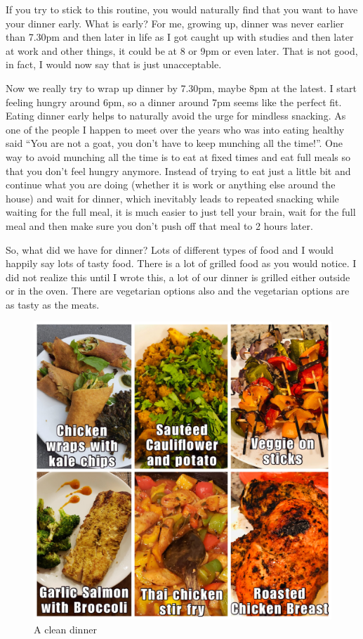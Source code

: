 \documentclass[
  oneside]{book}
\begin{document}
If you try to stick to this routine, you would naturally find that you want to have your dinner early. What is early? For me, growing up, dinner was never earlier than 7.30pm and then later in life as I got caught up with studies and then later at work and other things, it could be at 8 or 9pm or even later. That is not good, in fact, I would now say that is just unacceptable.

Now we really try to wrap up dinner by 7.30pm, maybe 8pm at the latest. I start feeling hungry around 6pm, so a dinner around 7pm seems like the perfect fit. Eating dinner early helps to naturally avoid the urge for mindless snacking. As one of the people I happen to meet over the years who was into eating healthy said ``You are not a goat, you don't have to keep munching all the time!''. One way to avoid munching all the time is to eat at fixed times and eat full meals so that you don't feel hungry anymore. Instead of trying to eat just a little bit and continue what you are doing (whether it is work or anything else around the house) and wait for dinner, which inevitably leads to repeated snacking while waiting for the full meal, it is much easier to just tell your brain, wait for the full meal and then make sure you don't push off that meal to 2 hours later.

So, what did we have for dinner? Lots of different types of food and I would happily say lots of tasty food. There is a lot of grilled food as you would notice. I did not realize this until I wrote this, a lot of our dinner is grilled either outside or in the oven. There are vegetarian options also and the vegetarian options are as tasty as the meats.

\begin{figure}
\centering
\includegraphics{pictures/dinner1.JPG}
\caption{A clean dinner}
\end{figure}
\end{document}
